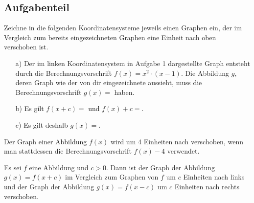 \documentclass[]{uebungsblatt}
\begin{document}
\subsection*{Aufgabenteil}
\begin{exercise}
    Zeichne in die folgenden Koordinatensysteme jeweils einen Graphen ein, der im Vergleich zum bereits eingezeichneten Graphen eine Einheit nach oben verschoben ist. 
    \begin{multicols}{2}\centering
        
    \end{multicols}
\end{exercise}
\begin{exercise}
    \begin{enumerate}
        \item[a)] Der im linken Koordinatensystem in Aufgabe 1 dargestellte Graph entsteht durch die Berechnungsvorschrift $f(x)=x^2\cdot (x-1)$. Die Abbildung $g$, deren Graph wie der von dir eingezeichnete aussieht, muss die Berechnungsvorschrift $g(x)=$ haben.
        \item[b)] Es gilt $f(x+c)=$ und $f(x)+c=$.
        \item[c)] Es gilt deshalb $g(x)=$.
    \end{enumerate}
\end{exercise}
\begin{exercise}
    Der Graph einer Abbildung $f(x)$ wird um 4 Einheiten nach  verschoben, wenn man stattdessen die Berechnungsvorschrift $f(x)-4$ verwendet.
\end{exercise}
\begin{remark}
    Es sei $f$ eine Abbildung und $c>0$. Dann ist der Graph der Abbildung $g(x)=f(x+c)$ im Vergleich zum Graphen von $f$ um $c$ Einheiten nach links und der Graph der Abbildung $g(x)=f(x-c)$ um $c$ Einheiten nach rechts verschoben.
\end{remark}
\end{document}
